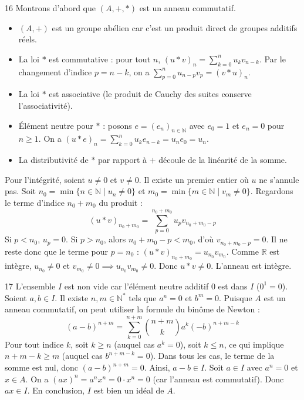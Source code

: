 \begin{correction}{16}
Montrons d'abord que $(A,+,*)$ est un anneau commutatif. 
\begin{itemize}
 \item $(A,+)$ est un groupe abélien car c'est un produit direct de groupes additifs réels. 
 \item La loi $*$ est commutative : pour tout $n$, $(u*v)_n = \sum_{k=0}^n u_k v_{n-k}$. Par le changement d'indice $p = n-k$, on a $\sum_{p=0}^n u_{n-p} v_p = (v*u)_n$. 
 \item La loi $*$ est associative (le produit de Cauchy des suites conserve l'associativité). 
 \item Élément neutre pour $*$ : posons $e = (e_n)_{n\in\mathbb{N}}$ avec $e_0=1$ et $e_n=0$ pour $n \ge 1$. On a $(u*e)_n = \sum_{k=0}^n u_k e_{n-k} = u_n e_0 = u_n$. 
 \item La distributivité de $*$ par rapport à $+$ découle de la linéarité de la somme. 
\end{itemize}
Pour l'intégrité, soient $u \neq 0$ et $v \neq 0$. Il existe un premier entier où $u$ ne s'annule pas. Soit $n_0 = \min \{n \in \mathbb{N} \mid u_n \neq 0\}$ et $m_0 = \min \{m \in \mathbb{N} \mid v_m \neq 0\}$. 
Regardons le terme d'indice $n_0+m_0$ du produit :
$$ (u*v)_{n_0+m_0} = \sum_{p=0}^{n_0+m_0} u_p v_{n_0+m_0-p} $$
Si $p < n_0$, $u_p = 0$. Si $p > n_0$, alors $n_0+m_0-p < m_0$, d'où $v_{n_0+m_0-p} = 0$. 
Il ne reste donc que le terme pour $p=n_0$ : $(u*v)_{n_0+m_0} = u_{n_0} v_{m_0}$. 
Comme $\mathbb{R}$ est intègre, $u_{n_0} \neq 0$ et $v_{m_0} \neq 0 \implies u_{n_0} v_{m_0} \neq 0$. Donc $u*v \neq 0$. L'anneau est intègre. 
\end{correction}

\begin{correction}{17}
L'ensemble $I$ est non vide car l'élément neutre additif $0$ est dans $I$ ($0^1=0$). 
Soient $a, b \in I$. Il existe $n, m \in \mathbb{N}^*$ tels que $a^n = 0$ et $b^m = 0$. 
Puisque $A$ est un anneau commutatif, on peut utiliser la formule du binôme de Newton :
$$ (a-b)^{n+m} = \sum_{k=0}^{n+m} \binom{n+m}{k} a^k (-b)^{n+m-k} $$ 
Pour tout indice $k$, soit $k \ge n$ (auquel cas $a^k = 0$), soit $k \le n$, ce qui implique $n+m-k \ge m$ (auquel cas $b^{n+m-k} = 0$). 
Dans tous les cas, le terme de la somme est nul, donc $(a-b)^{n+m} = 0$. Ainsi, $a-b \in I$. 
Soit $a \in I$ avec $a^n=0$ et $x \in A$. On a $(ax)^n = a^n x^n = 0 \cdot x^n = 0$ (car l'anneau est commutatif). Donc $ax \in I$. 
En conclusion, $I$ est bien un idéal de $A$. 
\end{correction}

